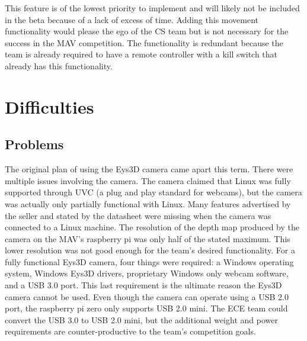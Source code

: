 \documentclass[onecolumn, oneside, letterpaper, draftclsnofoot, 10pt, compsoc]{IEEEtran}
\begin{document}
\noindent
\newline
This feature is of the lowest priority to implement and will likely not be included in the beta because of a lack of excess of time. Adding this movement functionality would please the ego of the CS team but is not necessary for the success in the MAV competition. The functionality is redundant because the team is already required to have a remote controller with a kill switch that already has this functionality.

\section{Difficulties}
\subsection{Problems}
The original plan of using the Eys3D camera came apart this term. There were multiple issues involving the camera. The camera claimed that Linux was fully supported through UVC (a plug and play standard for webcams), but the camera was actually only partially functional with Linux. Many features advertised by the seller and stated by the datasheet were missing when the camera was connected to a Linux machine. The resolution of the depth map produced by the camera on the MAV's raspberry pi was only half of the stated maximum. This lower resolution was not good enough for the team's desired functionality. For a fully functional Eys3D camera, four things were required: a Windows operating system, Windows Eys3D drivers, proprietary Windows only webcam software, and a USB 3.0 port. This last requirement is the ultimate reason the Eys3D camera cannot be used. Even though the camera can operate using a USB 2.0 port, the raspberry pi zero only supports USB 2.0 mini. The ECE team could convert the USB 3.0 to USB 2.0 mini, but the additional weight and power requirements are counter-productive to the team's competition goals.
\end{document}
